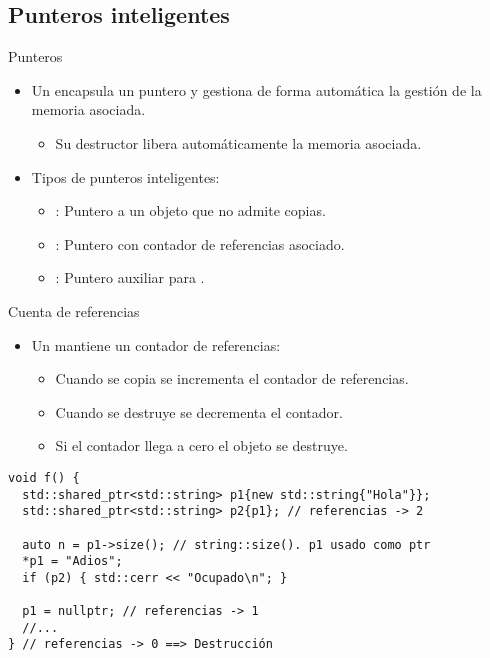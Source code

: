 \subsection{Punteros inteligentes}

\begin{frame}[t]{Punteros}
\begin{itemize}
  \item Un  encapsula un puntero y gestiona
        de forma automática la gestión de la memoria asociada.
    \begin{itemize}
      \item Su destructor libera automáticamente la memoria asociada.
    \end{itemize}

  \vfill\pause
  \item Tipos de punteros inteligentes:
    \begin{itemize}
      \item {}: Puntero a un objeto que no admite copias.
      \item {}: Puntero con contador de referencias asociado.
      \item {}: Puntero auxiliar para .
    \end{itemize}
\end{itemize}
\end{frame}


\begin{frame}[t,fragile]{Cuenta de referencias}
\begin{itemize}
  \item Un  mantiene un contador de referencias:
    \begin{itemize}
      \item Cuando se copia se incrementa el contador de referencias.
      \item Cuando se destruye se decrementa el contador.
      \item Si el contador llega a cero el objeto se destruye.
    \end{itemize}
\end{itemize}

\begin{lstlisting}
void f() {
  std::shared_ptr<std::string> p1{new std::string{"Hola"}};
  std::shared_ptr<std::string> p2{p1}; // referencias -> 2

  auto n = p1->size(); // string::size(). p1 usado como ptr
  *p1 = "Adios";
  if (p2) { std::cerr << "Ocupado\n"; }

  p1 = nullptr; // referencias -> 1
  //...
} // referencias -> 0 ==> Destrucción
\end{lstlisting}

\end{frame}


